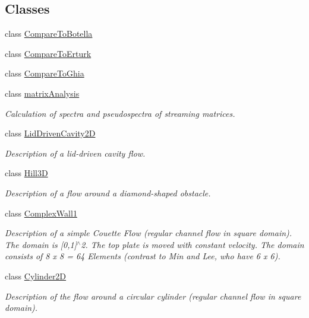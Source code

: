 \subsection*{Classes}
\begin{DoxyCompactItemize}
\item 
class \hyperlink{classnatrium_1_1CompareToBotella}{CompareToBotella}
\item 
class \hyperlink{classnatrium_1_1CompareToErturk}{CompareToErturk}
\item 
class \hyperlink{classnatrium_1_1CompareToGhia}{CompareToGhia}
\item 
class \hyperlink{classnatrium_1_1matrixAnalysis}{matrixAnalysis}
\begin{DoxyCompactList}\small\item\em Calculation of spectra and pseudospectra of streaming matrices. \item\end{DoxyCompactList}\item 
class \hyperlink{classnatrium_1_1LidDrivenCavity2D}{LidDrivenCavity2D}
\begin{DoxyCompactList}\small\item\em Description of a lid-\/driven cavity flow. \item\end{DoxyCompactList}\item 
class \hyperlink{classnatrium_1_1Hill3D}{Hill3D}
\begin{DoxyCompactList}\small\item\em Description of a flow around a diamond-\/shaped obstacle. \item\end{DoxyCompactList}\item 
class \hyperlink{classnatrium_1_1ComplexWall1}{ComplexWall1}
\begin{DoxyCompactList}\small\item\em Description of a simple Couette Flow (regular channel flow in square domain). The domain is \mbox{[}0,1\mbox{]}$^\wedge$2. The top plate is moved with constant velocity. The domain consists of 8 x 8 = 64 Elements (contrast to Min and Lee, who have 6 x 6). \item\end{DoxyCompactList}\item 
class \hyperlink{classnatrium_1_1Cylinder2D}{Cylinder2D}
\begin{DoxyCompactList}\small\item\em Description of the flow around a circular cylinder (regular channel flow in square domain). \item\end{DoxyCompactList}\item 

\end{DoxyCompactItemize}
